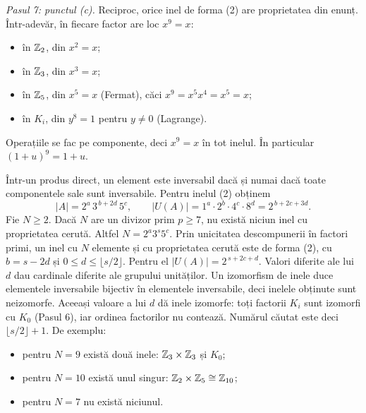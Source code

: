 \begin{solutie}
\smallskip
\textit{Pasul 7: punctul (c).} Reciproc, orice inel de forma (2) are proprietatea din enunț. Într-adevăr, în fiecare factor are loc $x^{9}=x$:
\begin{itemize}[nosep,leftmargin=1.4em]
  \item în $\mathbb{Z}_2$, din $x^{2}=x$;
  \item în $\mathbb{Z}_3$, din $x^{3}=x$;
  \item în $\mathbb{Z}_5$, din $x^{5}=x$ (Fermat), căci $x^{9}=x^{5}x^{4}=x^{5}=x$;
  \item în $K_i$, din $y^{8}=1$ pentru $y\neq 0$ (Lagrange).
\end{itemize}
Operațiile se fac pe componente, deci $x^{9}=x$ în tot inelul. În particular $(1+u)^{9}=1+u$.

Într-un produs direct, un element este inversabil dacă și numai dacă toate componentele sale sunt inversabile. Pentru inelul (2) obținem
\[
  |A|=2^{a}\,3^{\,b+2d}\,5^{c},\qquad |U(A)|=1^{a}\cdot 2^{b}\cdot 4^{c}\cdot 8^{d}=2^{\,b+2c+3d}.
\]
Fie $N\ge 2$. Dacă $N$ are un divizor prim $p\ge 7$, nu există niciun inel cu proprietatea cerută. Altfel $N=2^{a}3^{s}5^{c}$. Prin unicitatea descompunerii în factori primi, un inel cu $N$ elemente și cu proprietatea cerută este de forma (2), cu $b=s-2d$ și $0\le d\le\lfloor s/2\rfloor$. Pentru el $|U(A)|=2^{\,s+2c+d}$. Valori diferite ale lui $d$ dau cardinale diferite ale grupului unităților. Un izomorfism de inele duce elementele inversabile bijectiv în elementele inversabile, deci inelele obținute sunt neizomorfe. Aceeași valoare a lui $d$ dă inele izomorfe: toți factorii $K_i$ sunt izomorfi cu $K_0$ (Pasul 6), iar ordinea factorilor nu contează. Numărul căutat este deci $\lfloor s/2\rfloor+1$. De exemplu:
\begin{itemize}[nosep,leftmargin=1.4em]
  \item pentru $N=9$ există două inele: $\mathbb{Z}_3\times\mathbb{Z}_3$ și $K_0$;
  \item pentru $N=10$ există unul singur: $\mathbb{Z}_2\times\mathbb{Z}_5\cong\mathbb{Z}_{10}$;
  \item pentru $N=7$ nu există niciunul.
\end{itemize}


\end{solutie}

